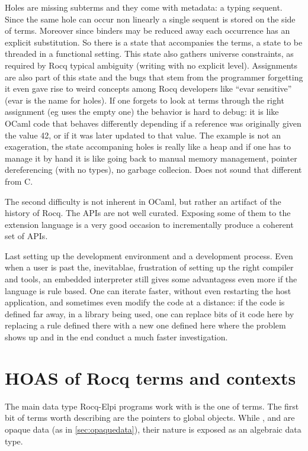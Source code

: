 \documentclass[a4paper, 11pt]{book}
\begin{document}
Holes are missing subterms and they come with metadata: a typing sequent.
Since the same hole can occur non linearly a single sequent is stored on the side of terms.
Moreover since binders may be reduced away each occurrence has an explicit
substitution. So there is a state that accompanies the terms, a state to be
threaded in a functional setting. This state also gathers universe constraints,
as required by Rocq typical ambiguity (writing  with no
explicit level).
Assignments are also part of this state and the bugs that stem from the
programmer forgetting it even gave rise to weird concepts among Rocq developers
like ``evar sensitive'' (evar is the name for holes). If one forgets to look at terms
through the right assignment (eg uses the empty one) the behavior is
hard to debug: it is like OCaml code that behaves differently depending
if a reference  was originally given the value 42, or
if it was later updated to that value.
The example is not an exageration, the state accompaning holes is really like
a heap and if one has to manage it by hand it is like
going back to manual memory management, pointer dereferencing (with no
types), no garbage collecion. Does not sound that different from C.

The second difficulty is not inherent in OCaml, but rather an artifact of the
history of Rocq. The APIs are not well curated. Exposing some of them to
the extension language is a very good occasion to incrementally produce
a coherent set of APIs.

Last setting up the development environment and a development
process. Even when a user is past the, inevitablae, frustration
of setting up the right compiler and tools, an embedded
interpreter still gives some advantagess even more if the
language is rule based. One can iterate faster, without even
restarting the host application, and sometimes even modify
the code at a distance: if the code is defined far away,
in a library being used, one can replace bits of it code
here by replacing a rule defined there with a new one
defined here where the problem shows up and in the end
conduct a much faster investigation.

\section{HOAS of Rocq terms and contexts}\label{GALLINA}

The main data type Rocq-Elpi programs work with is the one of
terms. The first bit of terms worth describing are the pointers
to global objects. While , 
 and  are opaque
data (as in \cref{sec:opaquedata}), their nature is exposed as
an algebraic data type.
\end{document}
